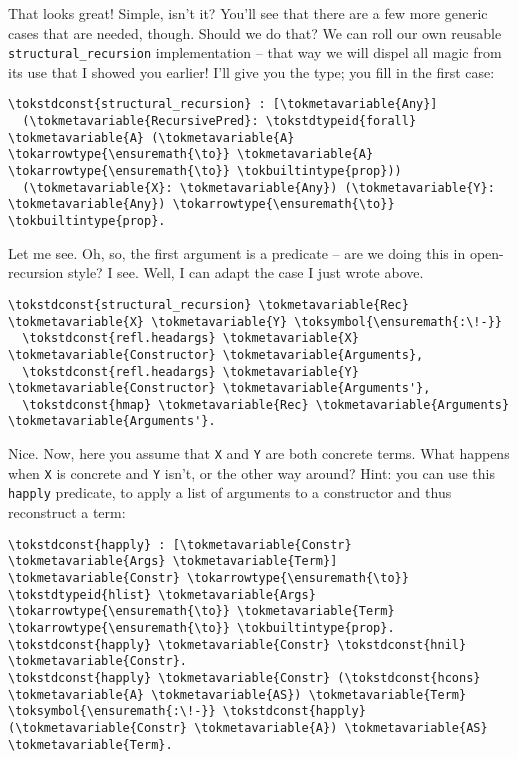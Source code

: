 \heroADVISOR{} That looks great! Simple, isn't it? You'll see that there are a
few more generic cases that are needed, though. Should we do that? We
can roll our own reusable \texttt{structural\_recursion} implementation
-- that way we will dispel all magic from its use that I showed you
earlier! I'll give you the type; you fill in the first case:

\importantCodeblock{}

\begin{verbatim}
\tokstdconst{structural_recursion} : [\tokmetavariable{Any}] 
  (\tokmetavariable{RecursivePred}: \tokstdtypeid{forall} \tokmetavariable{A} (\tokmetavariable{A} \tokarrowtype{\ensuremath{\to}} \tokmetavariable{A} \tokarrowtype{\ensuremath{\to}} \tokbuiltintype{prop}))
  (\tokmetavariable{X}: \tokmetavariable{Any}) (\tokmetavariable{Y}: \tokmetavariable{Any}) \tokarrowtype{\ensuremath{\to}} \tokbuiltintype{prop}.
\end{verbatim}

\importantCodeblockEnd{}

\heroSTUDENT{} Let me see. Oh, so, the first argument is a predicate -- are we
doing this in open-recursion style? I see. Well, I can adapt the case I
just wrote above.

\begin{verbatim}
\tokstdconst{structural_recursion} \tokmetavariable{Rec} \tokmetavariable{X} \tokmetavariable{Y} \toksymbol{\ensuremath{:\!-}}
  \tokstdconst{refl.headargs} \tokmetavariable{X} \tokmetavariable{Constructor} \tokmetavariable{Arguments},
  \tokstdconst{refl.headargs} \tokmetavariable{Y} \tokmetavariable{Constructor} \tokmetavariable{Arguments'},
  \tokstdconst{hmap} \tokmetavariable{Rec} \tokmetavariable{Arguments} \tokmetavariable{Arguments'}.
\end{verbatim}

\heroADVISOR{} Nice. Now, here you assume that \texttt{X} and \texttt{Y} are
both concrete terms. What happens when \texttt{X} is concrete and
\texttt{Y} isn't, or the other way around? Hint: you can use this
\texttt{happly} predicate, to apply a list of arguments to a constructor
and thus reconstruct a term:

\begin{verbatim}
\tokstdconst{happly} : [\tokmetavariable{Constr} \tokmetavariable{Args} \tokmetavariable{Term}] \tokmetavariable{Constr} \tokarrowtype{\ensuremath{\to}} \tokstdtypeid{hlist} \tokmetavariable{Args} \tokarrowtype{\ensuremath{\to}} \tokmetavariable{Term} \tokarrowtype{\ensuremath{\to}} \tokbuiltintype{prop}.
\tokstdconst{happly} \tokmetavariable{Constr} \tokstdconst{hnil} \tokmetavariable{Constr}.
\tokstdconst{happly} \tokmetavariable{Constr} (\tokstdconst{hcons} \tokmetavariable{A} \tokmetavariable{AS}) \tokmetavariable{Term} \toksymbol{\ensuremath{:\!-}} \tokstdconst{happly} (\tokmetavariable{Constr} \tokmetavariable{A}) \tokmetavariable{AS} \tokmetavariable{Term}.
\end{verbatim}

